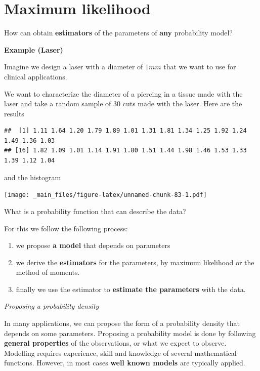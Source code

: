 \documentclass[
]{book}
\providecommand{\tightlist}{%
  \setlength{\itemsep}{0pt}\setlength{\parskip}{0pt}}
\begin{document}
\hypertarget{maximum-likelihood-1}{%
\section{Maximum likelihood}\label{maximum-likelihood-1}}

How can obtain \textbf{estimators} of the parameters of \textbf{any} probability model?

\textbf{Example (Laser)}

Imagine we design a laser with a diameter of \(1mm\) that we want to use for clinical applications.

We want to characterize the diameter of a piercing in a tissue made with the laser and take a random sample of \(30\) cuts made with the laser. Here are the results

\begin{verbatim}
##  [1] 1.11 1.64 1.20 1.79 1.89 1.01 1.31 1.81 1.34 1.25 1.92 1.24 1.49 1.36 1.03
## [16] 1.82 1.09 1.01 1.14 1.91 1.80 1.51 1.44 1.98 1.46 1.53 1.33 1.39 1.12 1.04
\end{verbatim}

and the histogram

\texttt{[image: \_main\_files/figure-latex/unnamed-chunk-83-1.pdf]}

What is a probability function that can describe the data?

For this we follow the following process:

\begin{enumerate}
\def\labelenumi{\arabic{enumi}.}
\tightlist
\item
  we propose \textbf{a model} that depends on parameters
\item
  we derive the \textbf{estimators} for the parameters, by maximum likelihood or the method of moments.
\item
  finally we use the estimator to \textbf{estimate the parameters} with the data.
\end{enumerate}

\emph{Proposing a probability density}

In many applications, we can propose the form of a probability density that depends on some parameters. Proposing a probability model is done by following \textbf{general properties} of the observations, or what we expect to observe. Modelling requires experience, skill and knowledge of several mathematical functions. However, in most cases \textbf{well known models} are typically applied.
\end{document}
